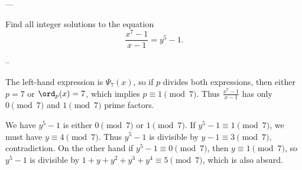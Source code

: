 
---

Find all integer solutions to the equation \[\frac{x^7-1}{x-1}=y^5-1.\]

--

The left-hand expression is $\Psi_7(x)$, so if $p$ divides both expressions, then either $p=7$ or $\ord_p(x)=7$, which implies $p\equiv1\pmod7$. Thus $\frac{x^7-1}{x-1}$ has only $0\pmod7$ and $1\pmod7$ prime factors.

We have $y^5-1$ is either $0\pmod7$ or $1\pmod7$. If $y^5-1\equiv1\pmod7$, we must have $y\equiv4\pmod7$. Thus $y^5-1$ is divisible by $y-1\equiv3\pmod7$, contradiction. On the other hand if $y^5-1\equiv0\pmod7$, then $y\equiv1\pmod7$, so $y^5-1$ is divisible by $1+y+y^2+y^3+y^4\equiv5\pmod7$, which is also absurd.

